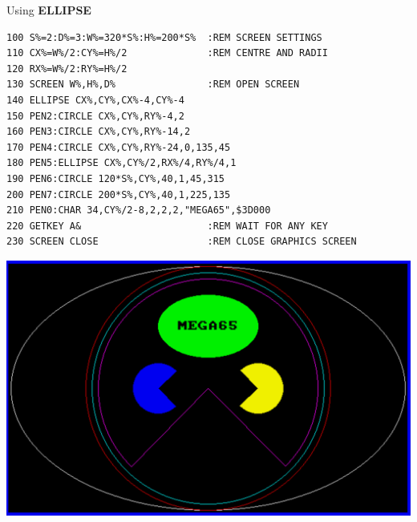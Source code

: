 \begin{description}[leftmargin=2cm,style=nextline]
\item [Example:] Using {\bf ELLIPSE}

\begin{tcolorbox}[colback=black,coltext=white]
\verbatimfont{\codefont}
\begin{verbatim}
100 S%=2:D%=3:W%=320*S%:H%=200*S%  :REM SCREEN SETTINGS
110 CX%=W%/2:CY%=H%/2              :REM CENTRE AND RADII
120 RX%=W%/2:RY%=H%/2
130 SCREEN W%,H%,D%                :REM OPEN SCREEN
140 ELLIPSE CX%,CY%,CX%-4,CY%-4
150 PEN2:CIRCLE CX%,CY%,RY%-4,2
160 PEN3:CIRCLE CX%,CY%,RY%-14,2
170 PEN4:CIRCLE CX%,CY%,RY%-24,0,135,45
180 PEN5:ELLIPSE CX%,CY%/2,RX%/4,RY%/4,1
190 PEN6:CIRCLE 120*S%,CY%,40,1,45,315
200 PEN7:CIRCLE 200*S%,CY%,40,1,225,135
210 PEN0:CHAR 34,CY%/2-8,2,2,2,"MEGA65",$3D000
220 GETKEY A&                      :REM WAIT FOR ANY KEY
230 SCREEN CLOSE                   :REM CLOSE GRAPHICS SCREEN
\end{verbatim}
\end{tcolorbox}

\item \begin{center}\includegraphics[width=0.7\linewidth]{images/ellipse.png}\end{center}

\end{description}


\newpage
